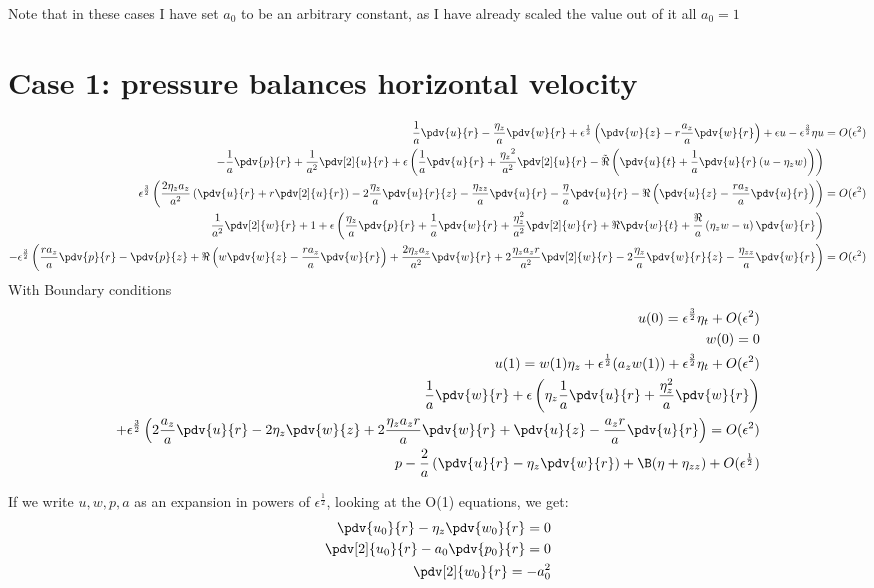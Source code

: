 \documentclass[12pt]{article}
\newcommand{\rt}{^{\frac{1}{2}}}
\newcommand{\rtt}{^{\frac{3}{2}}}
\begin{document}
Note that in these cases I have set $a_0$ to be an arbitrary constant, as I have already scaled the value out of it all $a_0 = 1$
\section{Case 1: pressure balances horizontal velocity}
	\begin{align}
\frac{1}{a}\pdv{u}{r}-\frac{\eta_z}{a}\pdv{w}{r} +\epsilon\rt\left(\pdv{w}{z}-r\frac{a_z}{a}\pdv{w}{r}\right)+\epsilon u -\epsilon\rtt\eta u &= O(\epsilon^2)\\
-\frac{1}{a}\pdv{p}{r}+\frac{1}{a^2}\pdv[2]{u}{r}+\epsilon\left(\frac{1}{a}\pdv{u}{r}+\frac{{\eta_z}^2}{a^2}\pdv[2]{u}{r}-\tilde\Re\left(\pdv{u}{t}+\frac{1}{a}\pdv{u}{r}\left(u-\eta_z w\right)\right)\right)&\\
\epsilon\rtt\left(\frac{2\eta_z a_z}{a^2}\left(\pdv{u}{r}+r\pdv[2]{u}{r}\right) -2\frac{\eta_z}{a}\pdv{u}{r}{z}-\frac{\eta_{zz}}a\pdv{u}{r}-\frac{\eta}{a}\pdv{u}{r}-\Re\left(\pdv{u}{z}-\frac{ra_z}{a}\pdv{u}{r}\right)\right)& = O(\epsilon^2)\\
\frac{1}{a^2}\pdv[2]{w}{r} + 1 +\epsilon\left(\frac{\eta_z}{a}\pdv{p}{r}+\frac{1}{a}\pdv{w}{r}+\frac{\eta_z^2}{a^2}\pdv[2]{w}{r}+\Re\pdv{w}{t}+\frac{\Re}{a}\left(\eta_z w-u\right)\pdv{w}{r}\right)&\\
-\epsilon\rtt\left(\frac{ra_z}{a}\pdv{p}{r}-\pdv{p}{z}+\Re\left(w\pdv{w}{z}-\frac{r a_z}{a}\pdv{w}{r}\right)+\frac{2\eta_za_z}{a^2}\pdv{w}{r}+2\frac{\eta_za_zr}{a^2}\pdv[2]{w}{r}-2\frac{\eta_z}{a}\pdv{w}{r}{z}-\frac{\eta_{zz}}{a}\pdv{w}{r}\right)& = O(\epsilon^2)
\end{align}
With Boundary conditions 
\begin{align}
u(0) = \epsilon\rtt\eta_t +O(\epsilon^2)\\
w(0) = 0 \\
u(1) =w(1)\eta_z +\epsilon\rt(a_z w(1)) +\epsilon\rtt\eta_t +O(\epsilon^2)\\
\frac{1}{a}\pdv{w}{r}+\epsilon\left(\eta_z\frac{1}{a}\pdv{u}{r}+\frac{\eta_z^2}{a}\pdv{w}{r}\right)\\
+\epsilon\rtt\left(2\frac{a_z}{a}\pdv{u}{r}-2\eta_z\pdv{w}{z}+2\frac{\eta_za_zr}{a}\pdv{w}{r}+\pdv{u}{z}-\frac{a_zr}{a}\pdv{u}{r}\right)=O(\epsilon^2)\\
p-\frac{2}{a}\left(\pdv{u}{r}-\eta_z\pdv{w}{r}\right)+\B(\eta+\eta_{zz}) + O(\epsilon\rt)
\end{align}

If we write $u,w,p,a$ as an expansion in powers of $\epsilon\rt$, looking at the O(1) equations, we get:
\begin{align}
\pdv{u_0}{r}-\eta_z\pdv{w_0}{r} = 0\\
\pdv[2]{u_0}{r}-a_0\pdv{p_0}{r} = 0\\
\pdv[2]{w_0}{r} = -a_0^2
\end{align}
\end{document}
